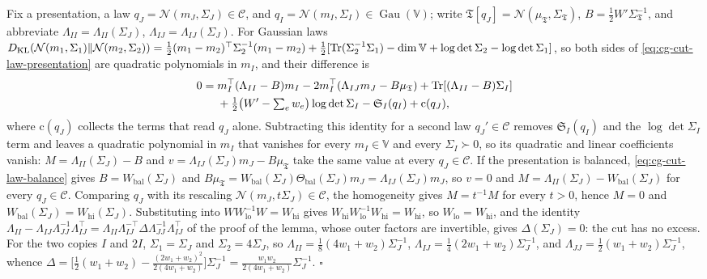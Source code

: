 Fix a presentation, a law $q_J=\mathcal N(m_J,\Sigma_J)\in\mathscr C$, and $q_I=\mathcal N(m_I,\Sigma_I)\in\operatorname{Gau}(\mathbb V)$;
write $\mathfrak T[q_J]=\mathcal N(\mu_{\mathfrak T},\Sigma_{\mathfrak T})$, $B=\tfrac12W'\Sigma_{\mathfrak T}^{-1}$, and abbreviate
$\Lambda_{II}=\Lambda_{II}(\Sigma_J)$, $\Lambda_{IJ}=\Lambda_{IJ}(\Sigma_J)$. For Gaussian laws
$D_{\mathrm{KL}}(\mathcal N(m_1,\Sigma_1)\Vert\mathcal N(m_2,\Sigma_2))=\tfrac12(m_1-m_2)^\top\Sigma_2^{-1}(m_1-m_2)
+\tfrac12[\operatorname{Tr}(\Sigma_2^{-1}\Sigma_1)-\dim\mathbb V+\log\det\Sigma_2-\log\det\Sigma_1]$, so both sides of
\eqref{eq:cg-cut-law-presentation} are quadratic polynomials in $m_I$, and their difference is
\begin{align*}
0={}&m_I^\top(\Lambda_{II}-B)m_I-2m_I^\top(\Lambda_{IJ}m_J-B\mu_{\mathfrak T})+\operatorname{Tr}[(\Lambda_{II}-B)\Sigma_I]\\
&+\tfrac12\bigl(W'-\textstyle\sum_ew_e\bigr)\log\det\Sigma_I-\mathfrak S_I(q_I)+\mathrm c(q_J),
\end{align*}
where $\mathrm c(q_J)$ collects the terms that read $q_J$ alone. Subtracting this identity for a second law
$q_J'\in\mathscr C$ removes $\mathfrak S_I(q_I)$ and the $\log\det\Sigma_I$ term and leaves a quadratic polynomial in $m_I$
that vanishes for every $m_I\in\mathbb V$ and every $\Sigma_I\succ0$, so its quadratic and linear coefficients
vanish: $M=\Lambda_{II}(\Sigma_J)-B$ and $v=\Lambda_{IJ}(\Sigma_J)m_J-B\mu_{\mathfrak T}$ take the same value at every
$q_J\in\mathscr C$. If the presentation is balanced, \eqref{eq:cg-cut-law-balance} gives
$B=W_{\mathrm{bal}}(\Sigma_J)$ and
$B\mu_{\mathfrak T}=W_{\mathrm{bal}}(\Sigma_J)\Theta_{\mathrm{bal}}(\Sigma_J)m_J=\Lambda_{IJ}(\Sigma_J)m_J$, so $v=0$ and
$M=\Lambda_{II}(\Sigma_J)-W_{\mathrm{bal}}(\Sigma_J)$ for every $q_J\in\mathscr C$. Comparing $q_J$ with its
rescaling $\mathcal N(m_J,t\Sigma_J)\in\mathscr C$, the homogeneity gives $M=t^{-1}M$ for every $t>0$, hence
$M=0$ and $W_{\mathrm{bal}}(\Sigma_J)=W_{\mathrm{hi}}(\Sigma_J)$. Substituting into $WW_{\mathrm{lo}}^{-1}W=W_{\mathrm{hi}}$
gives $W_{\mathrm{hi}}W_{\mathrm{lo}}^{-1}W_{\mathrm{hi}}=W_{\mathrm{hi}}$, so $W_{\mathrm{lo}}=W_{\mathrm{hi}}$, and the
identity $\Lambda_{II}-\Lambda_{IJ}\Lambda_{JJ}^{-1}\Lambda_{IJ}^\top=\Lambda_{II}\Lambda_{IJ}^{-\top}\Delta\Lambda_{JJ}^{-1}\Lambda_{IJ}^\top$
of the proof of the lemma, whose outer factors are invertible, gives $\Delta(\Sigma_J)=0$: the cut has no
excess. For the two copies $I$ and $2I$, $\Sigma_1=\Sigma_J$ and $\Sigma_2=4\Sigma_J$, so
$\Lambda_{II}=\tfrac18(4w_1+w_2)\Sigma_J^{-1}$, $\Lambda_{IJ}=\tfrac14(2w_1+w_2)\Sigma_J^{-1}$, and
$\Lambda_{JJ}=\tfrac12(w_1+w_2)\Sigma_J^{-1}$, whence
$\Delta=\bigl[\tfrac12(w_1+w_2)-\tfrac{(2w_1+w_2)^2}{2(4w_1+w_2)}\bigr]\Sigma_J^{-1}=\frac{w_1w_2}{2(4w_1+w_2)}\Sigma_J^{-1}$.
$\square$

